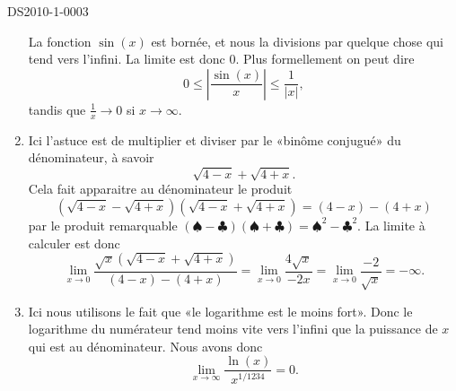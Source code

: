 \begin{corrige}{DS2010-1-0003}
\begin{enumerate}
			La fonction $\sin(x)$ est bornée, et nous la divisions par quelque chose qui tend vers l'infini. La limite est donc $0$. Plus formellement on peut dire
			\begin{equation}
				0\leq\left| \frac{ \sin(x) }{ x } \right| \leq \frac{ 1 }{ | x | },
			\end{equation}
			tandis que $\frac{ 1 }{ x }\to 0$ si $x\to\infty$.
		\item
			Ici l'astuce est de multiplier et diviser par le «binôme conjugué» du dénominateur, à savoir
			\begin{equation}
				\sqrt{4-x}+\sqrt{4+x}.
			\end{equation}
			Cela fait apparaitre au dénominateur le produit
			\begin{equation}
				(\sqrt{4-x}-\sqrt{4+x})(\sqrt{4-x}+\sqrt{4+x})=(4-x)-(4+x)
			\end{equation}
			par le produit remarquable $(\spadesuit-\clubsuit)(\spadesuit+\clubsuit)=\spadesuit^2-\clubsuit^2$. La limite à calculer est donc
			\begin{equation}
				\lim_{x\to 0} \frac{ \sqrt{x}\left( \sqrt{4-x}+\sqrt{4+x} \right) }{ (4-x)-(4+x) }=\lim_{x\to 0} \frac{ 4\sqrt{x} }{ -2x }=\lim_{x\to 0} \frac{ -2 }{ \sqrt{x} }=-\infty.
			\end{equation}

		\item
			Ici nous utilisons le fait que «le logarithme est le moins fort». Donc le logarithme du numérateur tend moins vite vers l'infini que la puissance de $x$ qui est au dénominateur. Nous avons donc
			\begin{equation}
				\lim_{x\to \infty} \frac{ \ln(x) }{ x^{1/1234} }=0.
			\end{equation}
	\end{enumerate}

\end{corrige}

